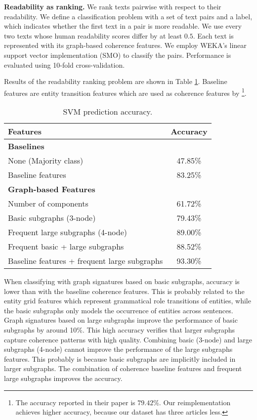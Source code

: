 \textbf{Readability as ranking.} We rank texts pairwise with respect to their readability. 
We define a classification problem with a set of text pairs and a label, which indicates whether the first text in a pair is more readable. 
We use every two texts whose human readability scores differ by at least $0.5$. 
Each text is represented with its graph-based coherence features. 
We employ WEKA's linear support vector implementation (SMO)  to classify the pairs. 
Performance is evaluated using 10-fold cross-validation.

Results of the readability ranking problem are shown in Table \ref{t:classification_task}. 
Baseline features are entity transition features which are used as coherence features by \footnote{The accuracy reported in their paper is $79.42\%$. Our reimplementation achieves higher accuracy, because our dataset has three articles less.}.

\begin{table}[!h]
\centering
\begin{small}
\begin{tabular}{@{}lc@{}}
\hline
\textbf{Features} & \textbf{Accuracy} \\\hline
\multicolumn{2}{l}{\textbf{Baselines}} \\
None (Majority class) & 47.85\% \\
Baseline features \cite{pitler08} & 83.25\% \\\hline
\multicolumn{2}{l}{\textbf{Graph-based Features}} \\
Number of components & 61.72\%\\
Basic subgraphs (3-node) & 79.43\% \\
Frequent large subgraphs (4-node) & 89.00\%  \\
Frequent basic + large subgraphs & 88.52\% \\
Baseline features + frequent large subgraphs & 93.30\% \\
\hline
\end{tabular}
\end{small}
\caption{SVM prediction accuracy.}\label{t:classification_task}
\end{table}

When classifying with graph signatures based on basic subgraphs, accuracy is lower than with the baseline coherence features. 
This is probably related to the entity grid features which represent grammatical role transitions of entities, while the basic subgraphs only models the occurrence of entities across sentences. 
Graph signatures based on large subgraphs improve the performance of basic subgraphs by around 10\%. 
This high accuracy verifies that larger subgraphs capture coherence patterns with high quality. 
Combining basic (3-node) and large subgraphs (4-node) cannot improve the performance of the large subgraphs features. 
This probably is because basic subgraphs are implicitly included in larger subgraphs. 
The combination of coherence baseline features and frequent large subgraphs improves the accuracy.



